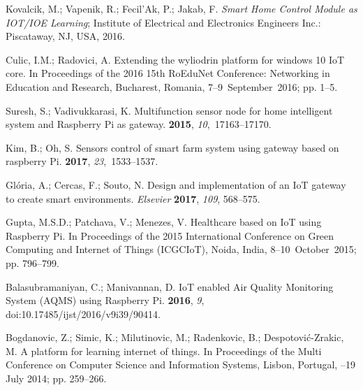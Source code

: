 \documentclass[symmetry,article,accept,moreauthors,pdftex10pt,a4paper]{mdpi}
\begin{document}
\begin{thebibliography}{999}
Kovalcik, M.; Vapenik, R.; Fecil'Ak, P.; Jakab, F.
\newblock \emph{Smart Home Control Module as IOT/IOE Learning};
\newblock Institute of Electrical and Electronics Engineers Inc.: Piscataway, NJ, USA, 2016.

Culic, I.M.; Radovici, A.
\newblock Extending the wyliodrin platform for windows 10 IoT core.
\newblock In Proceedings of the 2016 15th RoEduNet Conference: Networking in Education and Research, Bucharest, Romania, 
7--9~September~2016; pp. 1--5.

Suresh, S.; Vadivukkarasi, K.
\newblock Multifunction sensor node for home intelligent system and Raspberry
Pi as gateway.
 {\bf
	2015}, {\em 10},~17163--17170.

Kim, B.; Oh, S.
\newblock Sensors control of smart farm system using gateway based on raspberry
Pi.
 {\bf 2017}, {\em 23},~1533--1537.

Glória, A.; Cercas, F.; Souto, N.
\newblock Design and implementation of an IoT gateway to create smart
environments.
\newblock \emph{Elsevier} \textbf{2017}, \emph{109}, 568--575.

Gupta, M.S.D.; Patchava, V.; Menezes, V.
\newblock Healthcare based on IoT using Raspberry Pi.
\newblock  In Proceedings of the 2015 International Conference on Green Computing and Internet of
Things (ICGCIoT), Noida, India, 8--10~October~2015; pp. 796--799.

Balasubramaniyan, C.; Manivannan, D.
\newblock IoT enabled Air Quality Monitoring System (AQMS) using Raspberry Pi.
 {\bf 2016}, {\em 9}, doi:10.17485/ijst/2016/v9i39/90414.

Bogdanovic, Z.; Simic, K.; Milutinovic, M.; Radenkovic, B.; Despotović-Zrakic,
M.
\newblock A platform for learning internet of things. In Proceedings of the Multi Conference on Computer Science and Information Systems, Lisbon, Portugal,
--19 July 2014; pp. 259--266.


\end{thebibliography}
\end{document}
